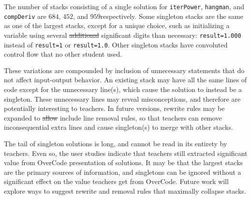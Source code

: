 \documentclass[12pt,twoside]{mitthesis}
\newcommand \codevar[1]{\texttt{#1}}
\providecommand{\DIFaddtex}[1]{{\protect\color{blue}\uwave{#1}}} %
\providecommand{\DIFdeltex}[1]{{\protect\color{red}\sout{#1}}}                      %
\providecommand{\DIFaddbegin}{} %
\providecommand{\DIFaddend}{} %
\providecommand{\DIFdelbegin}{} %
\providecommand{\DIFdelend}{} %
\providecommand{\DIFadd}[1]{\texorpdfstring{\DIFaddtex{#1}}{#1}} %
\providecommand{\DIFdel}[1]{\texorpdfstring{\DIFdeltex{#1}}{}} %
\begin{document}
{{{{{{{{{{The number of stacks consisting of a single solution for \codevar{iterPower}, \codevar{hangman}, and \codevar{compDeriv} are $684$, $452$, and $959$\DIFaddbegin \DIFadd{, }\DIFaddend respectively. Some singleton stacks are the same as one of the largest stacks, except for a unique choice, such as initializing a variable using several \DIFdelbegin \DIFdel{additional }\DIFdelend \DIFaddbegin \DIFadd{more }\DIFaddend significant digits than necessary: \codevar{result=1.000} instead of \codevar{result=1} or \codevar{result=1.0}. Other singleton stacks have convoluted control flow that no other student used. 

These variations are compounded by inclusion of unnecessary statements that do not affect input-output behavior. An existing stack may have all the same lines of code except for the unnecessary line(s), which cause the solution to instead be a singleton. These unnecessary lines may reveal misconceptions, and therefore are potentially interesting to teachers. In future versions, rewrite rules may be expanded to \DIFdelbegin \DIFdel{allow }\DIFdelend include line removal rules, so that teachers can remove inconsequential extra lines and cause singleton(s) to merge with other stacks. 

The tail of singleton solutions is long, and cannot be read in its entirety by teachers. Even so, the user studies indicate that teachers still extracted significant value from OverCode presentation of solutions. It may be that the largest stacks are the primary sources of information, and singletons can be ignored without a significant effect on the value teachers get from OverCode. Future work will explore ways to suggest rewrite and removal rules that maximally collapse stacks.

}}}}}}}}}}
\end{document}

